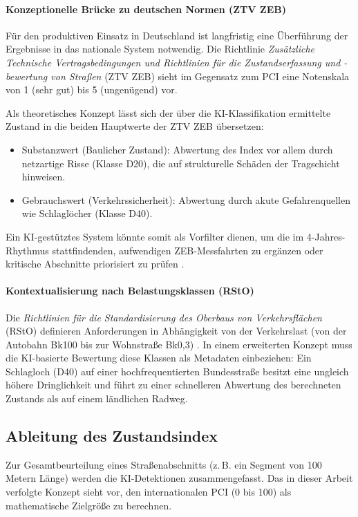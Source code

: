 \paragraph{Konzeptionelle Brücke zu deutschen Normen (ZTV ZEB)}
Für den produktiven Einsatz in Deutschland ist langfristig eine Überführung der Ergebnisse in das nationale System notwendig. Die Richtlinie \emph{Zusätzliche Technische Vertragsbedingungen und Richtlinien für die Zustandserfassung und -bewertung von Straßen} (ZTV ZEB) sieht im Gegensatz zum PCI eine Notenskala von 1 (sehr gut) bis 5 (ungenügend) vor. 

Als theoretisches Konzept lässt sich der über die KI-Klassifikation ermittelte Zustand in die beiden Hauptwerte der ZTV ZEB übersetzen:
\begin{itemize}
    \item Substanzwert (Baulicher Zustand): Abwertung des Index vor allem durch netzartige Risse (Klasse D20), die auf strukturelle Schäden der Tragschicht hinweisen.
    \item Gebrauchswert (Verkehrssicherheit): Abwertung durch akute Gefahrenquellen wie Schlaglöcher (Klasse D40).
\end{itemize}
Ein KI-gestütztes System könnte somit als Vorfilter dienen, um die im 4-Jahres-Rhythmus stattfindenden, aufwendigen ZEB-Messfahrten zu ergänzen oder kritische Abschnitte priorisiert zu prüfen \cite{fgsv2024_apske}.

\paragraph{Kontextualisierung nach Belastungsklassen (RStO)}
Die \emph{Richtlinien für die Standardisierung des Oberbaus von Verkehrsflächen} (RStO) definieren Anforderungen in Abhängigkeit von der Verkehrslast (von der Autobahn Bk100 bis zur Wohnstraße Bk0,3) \cite{vm_bw_2015_zeb}. In einem erweiterten Konzept muss die KI-basierte Bewertung diese Klassen als Metadaten einbeziehen: Ein Schlagloch (D40) auf einer hochfrequentierten Bundesstraße besitzt eine ungleich höhere Dringlichkeit und führt zu einer schnelleren Abwertung des berechneten Zustands als auf einem ländlichen Radweg.

\subsection{Ableitung des Zustandsindex}
\label{subsec:zustandsindex}

Zur Gesamtbeurteilung eines Straßenabschnitts (z.\,B. ein Segment von 100 Metern Länge) werden die KI-Detektionen zusammengefasst. Das in dieser Arbeit verfolgte Konzept sieht vor, den internationalen PCI (0 bis 100) als mathematische Zielgröße zu berechnen.


